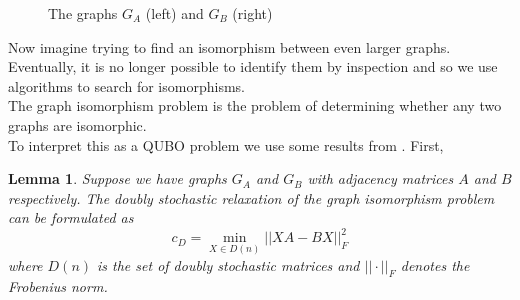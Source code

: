\documentclass{article}
\newtheorem{lem}[prop]{Lemma}
\begin{document}
\begin{figure}[H]
\begin{subfigure}[h]{0.4\linewidth}
    \end{subfigure}
    \caption{The graphs \(G_A\) (left) and \(G_B\) (right)}
    \label{fig:1}
\end{figure}

\noindent Now imagine trying to find an isomorphism between even larger graphs. Eventually, it is no longer possible to identify them by inspection and so we use algorithms to search for isomorphisms. \\

\noindent The graph isomorphism problem is the problem of determining whether any two graphs are isomorphic.\\

\noindent To interpret this as a QUBO problem we use some results from \autocite{klus2023continuous}. First,\\

\begin{lem}\label{lem:StochasticIso}
\cite[p.~6]{klus2023continuous} Suppose we have graphs \(G_A\) and \(G_B\) with adjacency matrices \(A\) and \(B\) respectively. The doubly stochastic relaxation of the graph isomorphism problem can be formulated as
\begin{equation*}
    c_D = \min_{X \in D(n)} ||XA - BX||^2_F
\end{equation*}
where \(D(n)\) is the set of doubly stochastic matrices and \(||\cdot||_F\) denotes the Frobenius norm.
\end{lem}
\end{document}
